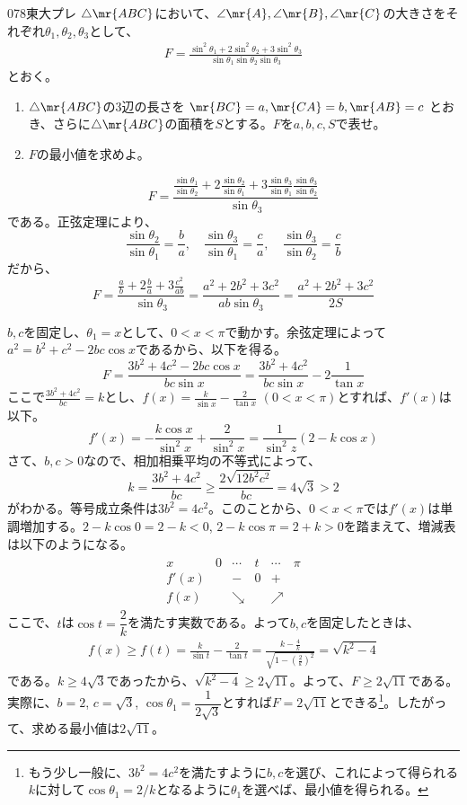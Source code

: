 \begin{prob}{078}{}{東大プレ}
 $\triangle\mr{ABC}$において、$\angle\mr{A}, \angle\mr{B}, \angle\mr{C}$の大きさをそれぞれ$\theta_1, \theta_2, \theta_3$として、
 \begin{align*}
  F=\frac{\sin^2\theta_1+2\sin^2\theta_2+3\sin^2\theta_3}{\sin\theta_1 \sin\theta_2 \sin\theta_3}
 \end{align*}
 とおく。
 \begin{enumerate}
  \item $\triangle\mr{ABC}$の3辺の長さを $\mr{BC}=a, \mr{CA}=b, \mr{AB}=c$ とおき、さらに$\triangle\mr{ABC}$の面積を$S$とする。$F$を$a, b, c, S$で表せ。
  \item $F$の最小値を求めよ。
 \end{enumerate}
\end{prob}

\[ F=\frac{\frac{\sin\theta_1}{\sin\theta_2}+2\frac{\sin\theta_2}{\sin\theta_1}+3\frac{\sin\theta_3}{\sin\theta_1}\frac{\sin\theta_3}{\sin\theta_2}}{\sin\theta_3} \]
である。正弦定理により、
\[ \frac{\sin\theta_2}{\sin\theta_1}=\frac{b}{a},\quad \frac{\sin\theta_3}{\sin\theta_1}=\frac{c}{a},\quad \frac{\sin\theta_3}{\sin\theta_2}=\frac{c}{b} \]
だから、
\[ F=\frac{\frac{a}{b}+2\frac{b}{a}+3\frac{c^2}{ab}}{\sin\theta_3}=\frac{a^2+2b^2+3c^2}{ab\sin\theta_3}=\frac{a^2+2b^2+3c^2}{2S} \]

$b, c$を固定し、$\theta_1=x$として、$0<x<\pi$で動かす。余弦定理によって$a^2=b^2+c^2-2bc\cos x$であるから、以下を得る。
\[ F=\frac{3b^2+4c^2-2bc\cos x}{bc\sin x}=\frac{3b^2+4c^2}{bc\sin x}-2\frac{1}{\tan x} \]
ここで$\frac{3b^2+4c^2}{bc}=k$とし、$f(x)=\frac{k}{\sin x}-\frac{2}{\tan x}$ $(0<x<\pi)$とすれば、$f'(x)$は以下。
\[ f'(x)=-\frac{k\cos x}{\sin^2 x}+\frac{2}{\sin^2 x}=\frac{1}{\sin^2 z}(2-k\cos x) \]
さて、$b, c>0$なので、相加相乗平均の不等式によって、
\[ k=\frac{3b^2+4c^2}{bc}\ge\frac{2\sqrt{12b^2c^2}}{bc}=4\sqrt{3}>2 \]
がわかる。等号成立条件は$3b^2=4c^2$。このことから、$0<x<\pi$では$f'(x)$は単調増加する。$2-k\cos 0=2-k<0$, $2-k\cos\pi=2+k>0$を踏まえて、増減表は以下のようになる。
\begin{align*}
 \begin{array}{c|c|c|c|c|c}
  x& 0 & \cdots & t & \cdots & \pi \\ \hline
  f'(x) & & - & 0 & + &  \\ \hline
  f(x) & & \searrow & & \nearrow & 
 \end{array}
\end{align*}
ここで、$t$は$\cos t=\dfrac{2}{k}$を満たす実数である。よって$b, c$を固定したときは、
\begin{align*}
 f(x)\ge f(t)=\frac{k}{\sin t} -\frac{2}{\tan t}=\frac{k-\frac{4}{k}}{\sqrt{1-\left(\frac{2}{k}\right)^2}}=\sqrt{k^2-4}
\end{align*}
である。$k\ge 4\sqrt{3}$であったから、$\sqrt{k^2-4}\ge 2\sqrt{11}$。よって、$F\ge 2\sqrt{11}$である。実際に、$b=2$, $c=\sqrt{3}$, $\cos\theta_1=\dfrac{1}{2\sqrt{3}}$とすれば$F=2\sqrt{11}$とできる\footnote{もう少し一般に、$3b^2=4c^2$を満たすように$b, c$を選び、これによって得られる$k$に対して$\cos\theta_1=2/k$となるように$\theta_1$を選べば、最小値を得られる。}。したがって、求める最小値は$2\sqrt{11}$。
